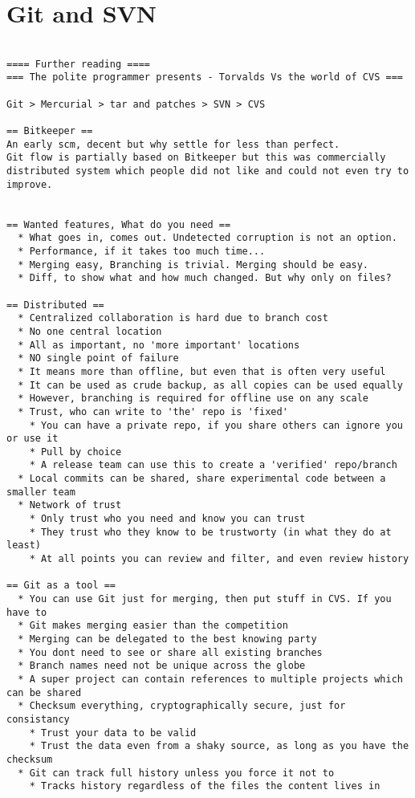 
\section{Git and SVN}


\begin{verbatim}

==== Further reading ====
=== The polite programmer presents - Torvalds Vs the world of CVS ===

Git > Mercurial > tar and patches > SVN > CVS

== Bitkeeper ==
An early scm, decent but why settle for less than perfect.
Git flow is partially based on Bitkeeper but this was commercially distributed system which people did not like and could not even try to improve.


== Wanted features, What do you need ==
  * What goes in, comes out. Undetected corruption is not an option.
  * Performance, if it takes too much time...
  * Merging easy, Branching is trivial. Merging should be easy.
  * Diff, to show what and how much changed. But why only on files?

== Distributed ==
  * Centralized collaboration is hard due to branch cost
  * No one central location
  * All as important, no 'more important' locations
  * NO single point of failure
  * It means more than offline, but even that is often very useful
  * It can be used as crude backup, as all copies can be used equally
  * However, branching is required for offline use on any scale
  * Trust, who can write to 'the' repo is 'fixed'
    * You can have a private repo, if you share others can ignore you or use it
    * Pull by choice
    * A release team can use this to create a 'verified' repo/branch 
  * Local commits can be shared, share experimental code between a smaller team
  * Network of trust
    * Only trust who you need and know you can trust
    * They trust who they know to be trustworty (in what they do at least)
    * At all points you can review and filter, and even review history

== Git as a tool ==
  * You can use Git just for merging, then put stuff in CVS. If you have to
  * Git makes merging easier than the competition
  * Merging can be delegated to the best knowing party
  * You dont need to see or share all existing branches
  * Branch names need not be unique across the globe
  * A super project can contain references to multiple projects which can be shared
  * Checksum everything, cryptographically secure, just for consistancy
    * Trust your data to be valid
    * Trust the data even from a shaky source, as long as you have the checksum
  * Git can track full history unless you force it not to
    * Tracks history regardless of the files the content lives in




\end{verbatim}
